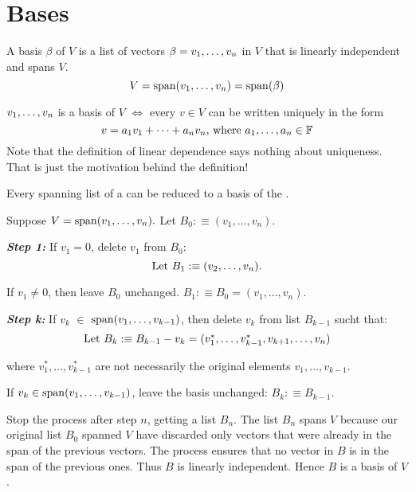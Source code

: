 \section{Bases}


\setcounter{thm}{25}
\begin{mydef} [Basis]
  A basis $\beta$ of $V$ is a list of vectors $\beta = v_1, \dots, v_n$ in $V$ that is linearly independent and spans $V$.
  \begin{equation}
    V = \operatorname{span} (v_1, \dots, v_n) = \operatorname{span} ( \beta )
  \end{equation}
\end{mydef}

\setcounter{thm}{27}
\begin{thm} 
  $v_1, \dots, v_n$ is a basis of $V$ $\iff$ every $v \in V$ can be written uniquely in the form
  \begin{equation}
    v=a_1 v_1 + \dots + a_n v_n $, where $ a_1, \dots, a_n \in \myF
  \end{equation}
  Note that the definition of linear dependence says nothing about uniqueness. That is just the motivation behind the definition!
\end{thm}

\setcounter{thm}{29}
\begin{thm}  
  \label{thm: every spanning list contains a basis}
  Every spanning list of a \vs can be reduced to a basis of the \vs.
\end{thm}
\begin{prf}
  Suppose $V=\operatorname{span} (v_1, \ldots, v_n).$ Let $B_0 :\equiv (v_1, \ldots, v_n)$.
  
  \emph{\bfseries Step 1: } If $v_1 = 0$, delete $v_1$ from $B_0$: 
  \begin{equation}
    $Let $B_1 :\equiv (v_2, \ldots, v_n).
  \end{equation} 
  
  If $v_1 \neq 0$, then leave $B_0$ unchanged. $B_1 :\equiv B_0=(v_1, \ldots, v_n)$.
  
  \emph{\bfseries Step k: } If $v_k$ $\in$ $\operatorname{span} (v_1, \ldots, v_{k-1})$, then delete $v_k$ from list $B_{k-1}$ sucht that:
  \begin{equation}
    $Let $B_k :\equiv B_{k-1} - v_k = (v_{1}^*, \ldots, v_{k-1}^*, v_{k+1}, \ldots, v_n)
  \end{equation} 
  
  where $v_1^*, \ldots, v_{k-1}^*$ are not necessarily the original elements $v_1, \ldots, v_{k-1}$.
  
  If $v_k \in \operatorname{span} (v_1, \ldots, v_{k-1})$, leave the basis unchanged: $B_k :\equiv B_{k-1}$.
  
  Stop the process after step $n$, getting a list $B_n$. The list $B_n$ spans $V$ because our original list $B_0$ spanned $V$  have discarded only vectors that were already in the span of the previous vectors. The process ensures that no vector in $B$ is in the span of the previous ones. Thus $B$ is linearly independent. Hence $B$ is a basis of $V$.
\end{prf}

